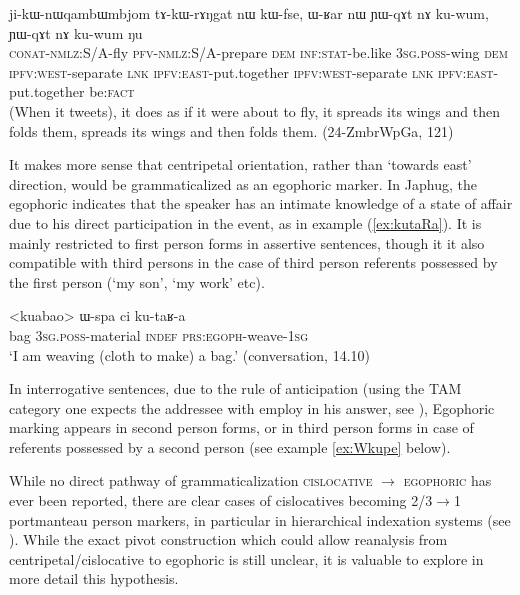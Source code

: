 \documentclass[oldfontcommands,oneside,a4paper,11pt]{article}
\newcommand{\ipa}[1]{\mbox{\phon #1}} %
\begin{document}
\begin{exe}
\ex \label{ex:YWqAt}
\gll \ipa{ji-kɯ-nɯqambɯmbjom} 	\ipa{tɤ-kɯ-rɤŋgat} 	\ipa{nɯ} 	\ipa{kɯ-fse,} 	\ipa{ɯ-ʁar} 	\ipa{nɯ} 	\ipa{ɲɯ-qɤt} 	\ipa{nɤ} 	\ipa{ku-wum}, 	\ipa{ɲɯ-qɤt} 	\ipa{nɤ} 	\ipa{ku-wum} \ipa{ŋu} \\
\textsc{conat-nmlz:S/A}-fly \textsc{pfv-nmlz:S/A}-prepare \textsc{dem} \textsc{inf:stat}-be.like \textsc{3sg.poss}-wing \textsc{dem}  \textsc{ipfv:west}-separate \textsc{lnk} \textsc{ipfv:east}-put.together \textsc{ipfv:west}-separate \textsc{lnk} \textsc{ipfv:east}-put.together be:\textsc{fact} \\
\glt (When it tweets), it does as if it were about to fly, it spreads its wings and then folds them, spreads its wings and then folds them. (24-ZmbrWpGa, 121)
\end{exe}

It makes more sense that centripetal orientation, rather than `towards east' direction, would be grammaticalized as an egophoric marker. In Japhug, the egophoric indicates that the speaker has an  intimate knowledge of a state of affair due to his direct participation in the event, as in example (\ref{ex:kutaRa}). It is mainly restricted to first person forms in assertive sentences, though it it also compatible with third persons in the case of third person referents possessed by the first person (`my son', `my work' etc). 

\begin{exe}
\ex \label{ex:kutaRa}
\gll 
<kuabao> 	\ipa{ɯ-spa}  	\ipa{ci}  	\ipa{ku-taʁ-a}  \\
bag \textsc{3sg.poss}-material \textsc{indef} \textsc{prs:egoph}-weave-\textsc{1sg} \\
\glt `I am weaving (cloth to make) a bag.' (conversation, 14.10)
\end{exe}

In interrogative sentences, due to the rule of anticipation (using the TAM category one expects the addressee with employ in his answer, see \citealt{tournadre14evidentiality}), Egophoric marking appears in second person forms, or in third person forms in case of referents possessed by a second person (see example \ref{ex:Wkupe} below).

While no direct pathway of grammaticalization \textsc{cislocative} $\rightarrow$ \textsc{egophoric} has ever been reported, there are clear cases of cislocatives becoming 2/3$\rightarrow$1 portmanteau person markers, in particular in hierarchical indexation systems (see \citealt{jacques14inverse}). While the exact pivot construction which could allow reanalysis from centripetal/cislocative to egophoric is still unclear, it is valuable to explore in more detail this hypothesis.
\end{document}
